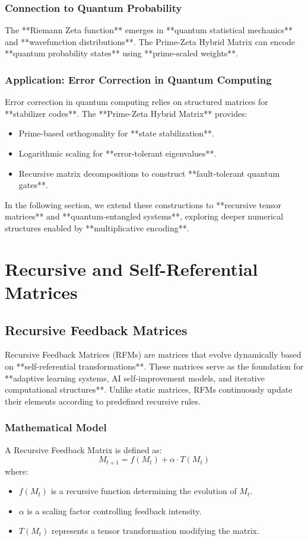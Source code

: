 \documentclass{article}
\theoremstyle{plain}
\begin{document}
\subsubsection{Connection to Quantum Probability}
The **Riemann Zeta function** emerges in **quantum statistical mechanics** and **wavefunction distributions**. The Prime-Zeta Hybrid Matrix can encode **quantum probability states** using **prime-scaled weights**.

\subsubsection{Application: Error Correction in Quantum Computing}
Error correction in quantum computing relies on structured matrices for **stabilizer codes**. The **Prime-Zeta Hybrid Matrix** provides:
\begin{itemize}
    \item Prime-based orthogonality for **state stabilization**.
    \item Logarithmic scaling for **error-tolerant eigenvalues**.
    \item Recursive matrix decompositions to construct **fault-tolerant quantum gates**.
\end{itemize}

In the following section, we extend these constructions to **recursive tensor matrices** and **quantum-entangled systems**, exploring deeper numerical structures enabled by **multiplicative encoding**.
\section{Recursive and Self-Referential Matrices}

\subsection{Recursive Feedback Matrices}

Recursive Feedback Matrices (RFMs) are matrices that evolve dynamically based on **self-referential transformations**. These matrices serve as the foundation for **adaptive learning systems, AI self-improvement models, and iterative computational structures**. Unlike static matrices, RFMs continuously update their elements according to predefined recursive rules.

\subsubsection{Mathematical Model}
A Recursive Feedback Matrix is defined as:
\begin{equation}
    M_{t+1} = f(M_t) + \alpha \cdot T(M_t)
\end{equation}
where:
\begin{itemize}
    \item \( f(M_t) \) is a recursive function determining the evolution of \( M_t \).
    \item \( \alpha \) is a scaling factor controlling feedback intensity.
    \item \( T(M_t) \) represents a tensor transformation modifying the matrix.
\end{itemize}
\end{document}
